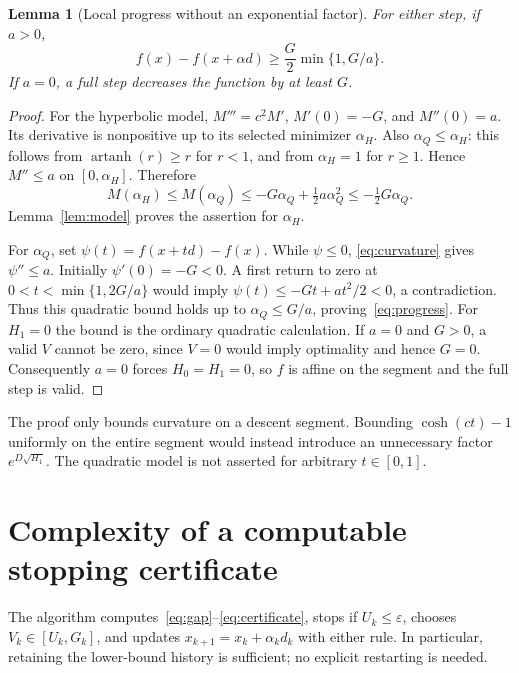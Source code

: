 \documentclass[11pt]{article}
\newtheorem{lemma}[theorem]{Lemma}
\DeclareMathOperator{\artanh}{artanh}
\begin{document}
\begin{lemma}[Local progress without an exponential factor]\label{lem:progress}
For either step, if $a>0$,
\begin{equation}\label{eq:progress}
 f(x)-f(x+\alpha d)\ge\frac G2\min\{1,G/a\}.
\end{equation}
If $a=0$, a full step decreases the function by at least $G$.
\end{lemma}
\begin{proof}
For the hyperbolic model, $M'''=c^2M'$, $M'(0)=-G$, and $M''(0)=a$.
Its derivative is nonpositive up to its selected minimizer $\alpha_H$.
Also $\alpha_Q\le\alpha_H$: this follows from $\artanh(r)\ge r$ for
$r<1$, and from $\alpha_H=1$ for $r\ge1$. Hence $M''\le a$ on
$[0,\alpha_H]$. Therefore
\[
 M(\alpha_H)\le M(\alpha_Q)\le-G\alpha_Q+\tfrac12a\alpha_Q^2
 \le-\tfrac12G\alpha_Q.
\]
Lemma~\ref{lem:model} proves the assertion for $\alpha_H$.

For $\alpha_Q$, set $\psi(t)=f(x+td)-f(x)$. While $\psi\le0$,
\eqref{eq:curvature} gives $\psi''\le a$. Initially $\psi'(0)=-G<0$.
A first return to zero at $0<t<\min\{1,2G/a\}$ would imply
$\psi(t)\le-Gt+at^2/2<0$, a contradiction. Thus this quadratic bound
holds up to $\alpha_Q\le G/a$, proving~\eqref{eq:progress}.
For $H_1=0$ the bound is the ordinary quadratic calculation.
If $a=0$ and $G>0$, a valid $V$ cannot be zero, since
$V=0$ would imply optimality and hence $G=0$. Consequently $a=0$ forces
$H_0=H_1=0$, so $f$ is affine on the segment and the full step is valid.
\end{proof}

The proof only bounds curvature on a descent segment. Bounding
$\cosh(ct)-1$ uniformly on the entire segment would instead introduce
an unnecessary factor $e^{D\sqrt{H_1}}$. The quadratic model is not
asserted for arbitrary $t\in[0,1]$.

\section{Complexity of a computable stopping certificate}
The algorithm computes~\eqref{eq:gap}--\eqref{eq:certificate}, stops if
$U_k\le\varepsilon$, chooses $V_k\in[U_k,G_k]$, and updates
$x_{k+1}=x_k+\alpha_kd_k$ with either rule. In particular, retaining
the lower-bound history is sufficient; no explicit restarting is needed.
\end{document}
